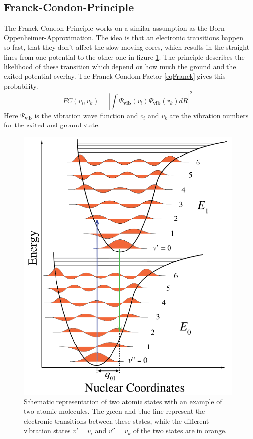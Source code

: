 \subsection{Franck-Condon-Principle}
The Franck-Condon-Principle works on a similar assumption as the Born-Oppenheimer-Approximation. The idea is that an electronic transitions happen so fast, that they don't affect the slow moving cores, which results in the straight lines from one potential to the other one in figure \ref{figFranck}.
The principle describes the likelihood of these transition which depend on how much the ground and the exited potential overlay. The Franck-Condom-Factor \ref{eqFranck} gives this probability. 
\begin{equation}
	FC(v_i,v_k)=|\int \Psi_{\textbf{vib}}(v_i)\Psi_{\textbf{vib}}(v_k)dR|^2
	\label{eqFranck}
\end{equation}
Here $\Psi_{\textbf{vib}}$ is the vibration wave function and $v_i$ and $v_k$ are the vibration numbers for the exited and ground state.
\begin{figure}[ht]
	\includegraphics[scale=0.23]{Bild/FranckFaktor.png}
	\centering
	\caption[Franck-Condon-Principle]{\small Schematic representation of two atomic states with an example of two atomic molecules. The green and blue line represent the electronic transitions between these states, while the different vibration states $v'=v_i$ and $v''=v_k$ of the two states are in orange.\cite{Frank}}
	\label{figFranck}
\end{figure}
\FloatBarrier
